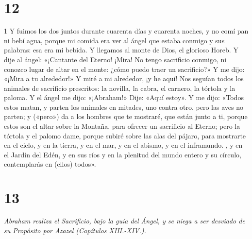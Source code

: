 \chapter{12}

\par 1 Y fuimos los dos juntos durante cuarenta días y cuarenta noches, y no comí pan ni bebí agua, porque mi comida era ver al ángel que estaba conmigo y sus palabras: esa era mi bebida. Y llegamos al monte de Dios, el glorioso Horeb. Y dije al ángel: «¡Cantante del Eterno! ¡Mira! No tengo sacrificio conmigo, ni conozco lugar de altar en el monte: ¿cómo puedo traer un sacrificio?» Y me dijo: «¡Mira a tu alrededor!» Y miré a mi alrededor, ¡y he aquí! Nos seguían todos los animales de sacrificio prescritos: la novilla, la cabra, el carnero, la tórtola y la paloma. Y el ángel me dijo: «¡Abraham!» Dije: «Aquí estoy». Y me dijo: «Todos estos matan, y parten los animales en mitades, uno contra otro, pero las aves no parten; y («pero») da a los hombres que te mostraré, que están junto a ti, porque estos son el altar sobre la Montaña, para ofrecer un sacrificio al Eterno; pero la tórtola y el palomo dame, porque subiré sobre las alas del pájaro, para mostrarte en el cielo, y en la tierra, y en el mar, y en el abismo, y en el inframundo. , y en el Jardín del Edén, y en sus ríos y en la plenitud del mundo entero y su círculo, contemplarás en (ellos) todos».

\chapter{13}

\par \textit{Abraham realiza el Sacrificio, bajo la guía del Ángel, y se niega a ser desviado de su Propósito por Azazel (Capítulos XIII.-XIV.).}

